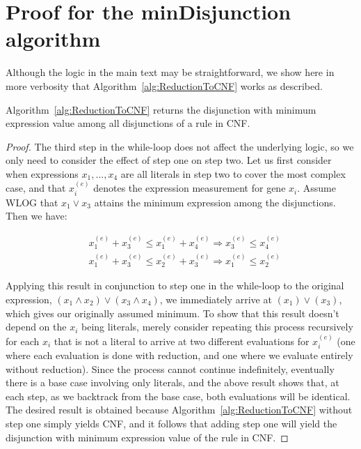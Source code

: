 
\section{Proof for the minDisjunction algorithm}

Although the logic in the main text may be straightforward, we show
here in more verbosity that Algorithm~\ref{alg:ReductionToCNF} works
as described.

\begin{Theorem}
\label{thm:ReductionToCNF}
Algorithm~\ref{alg:ReductionToCNF} returns the disjunction with
minimum expression value among all disjunctions of a rule in CNF.
\end{Theorem}

\begin{proof}
The third step in the while-loop does not affect the
underlying logic, so we only need to consider the effect of step one
on step two.  Let us first consider when expressions $x_1, ..., x_4$
are all literals in step two to cover the most complex case, and that
$x_i^{(e)}$ denotes the expression measurement for gene $x_i$. Assume
WLOG that $x_1 \lor x_3$ attains the minimum expression among the
disjunctions. Then we have:

\begin{align*}
&x_{1}^{(e)} + x_{3}^{(e)} \leq x_{1}^{(e)} + x_{4}^{(e)} \Rightarrow x_{3}^{(e)} \leq x_{4}^{(e)} \\
&x_{1}^{(e)} + x_{3}^{(e)} \leq x_{2}^{(e)} + x_{3}^{(e)} \Rightarrow x_{1}^{(e)} \leq x_{2}^{(e)} 
\end{align*}

Applying this result in conjunction to step one in the while-loop to
the original expression, $(x_1 \land x_2) \lor (x_3 \land x_4)$, we
immediately arrive at $(x_1) \lor (x_3)$, which gives our originally
assumed minimum. To show that this result doesn't depend on the $x_i$
being literals, merely consider repeating this process recursively for
each $x_i$ that is not a literal to arrive at two different
evaluations for $x_i^{(e)}$ (one where each evaluation is done with reduction, 
and one where we evaluate entirely without reduction). 
Since the process cannot continue
indefinitely, eventually there is a base case involving only literals,
and the above result shows that, at each step, as we backtrack from the base case,
both evaluations will be identical. The desired result is obtained
because Algorithm~\ref{alg:ReductionToCNF} without step one simply yields CNF,
and it follows that adding step one will yield the disjunction with 
minimum expression value of the rule in CNF.
\end{proof}

